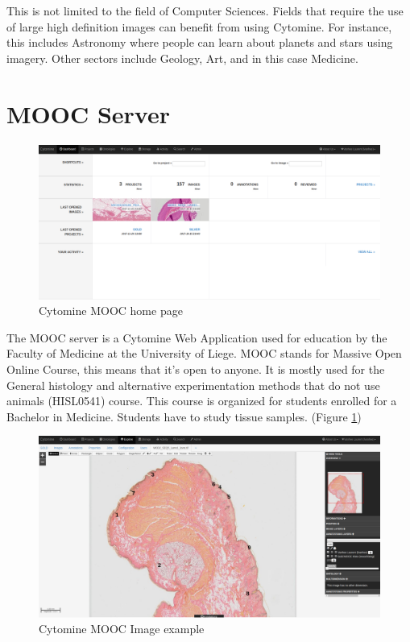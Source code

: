 \documentclass[a4paper,11pt]{report}
\numberwithin{figure}{chapter} %
\begin{document}
This is not limited to the field of Computer Sciences.
Fields that require the use of large high definition images can benefit from using Cytomine.
For instance, this includes Astronomy where people can learn about planets and stars using imagery.
Other sectors include Geology, Art, and in this case Medicine.


\section{MOOC Server}

      \begin{figure}[H]
      \centering
      \includegraphics[width=.95\linewidth]{images/cytomine_home.png}
      \caption{Cytomine MOOC home page}
      \end{figure}

The MOOC server is a Cytomine Web Application used for education by the Faculty of Medicine at the University of Liege.
MOOC stands for Massive Open Online Course, this means that it's open to anyone.
It is mostly used for the General histology and alternative experimentation methods that do not use animals (HISL0541) course.
This course is organized for students enrolled for a Bachelor in Medicine.
Students have to study tissue samples. (Figure \ref{fig:lame_example})

      \begin{figure}[H]
      \centering
      \includegraphics[width=.95\linewidth]{images/lame_cytomine.png}
      \caption{Cytomine MOOC Image example}
      \label{fig:lame_example}
      \end{figure}
\end{document}
